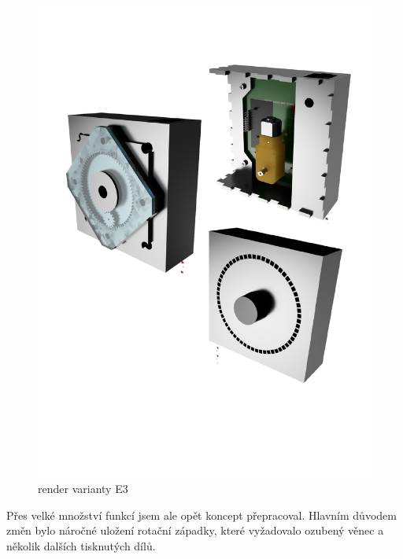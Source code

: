\begin{figure}[htbp]
    \centering
    \includegraphics[width=\textwidth]{kapitoly/obrazky/E3/rendery.pdf}
    \caption{render varianty E3}
    \label{fig:E3-renderi}
\end{figure}

Přes velké množství funkcí jsem ale opět koncept přepracoval. Hlavním důvodem změn bylo náročné uložení rotační západky, 
které vyžadovalo ozubený věnec a několik dalších tisknutých dílů.

\newpage